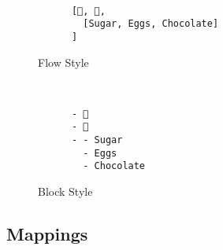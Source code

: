 \documentclass[a4paper, svgnames, 12pt]{article}
\begin{document}
\begin{figure}[H]
  \begin{minipage}[t]{0.48\textwidth}
    \vspace{0pt}
    \begin{bchart}[max=9, width=0.85\textwidth]
    \end{bchart}
  \end{minipage}
  \begin{minipage}[t]{0pt}~\end{minipage}
  \begin{minipage}[t]{0.48\textwidth}
    \vspace{0pt}
    \begin{verbatim}
      [🍎, 🍊,
        [Sugar, Eggs, Chocolate]
      ]
    \end{verbatim}
  \end{minipage}
  \caption{Flow Style}
\end{figure}

\begin{figure}[H]
  \begin{minipage}[t]{0.48\textwidth}
    \vspace{0pt}
    \begin{bchart}[max=9, width=0.85\textwidth]
    \end{bchart}
  \end{minipage}
  \begin{minipage}[t]{0pt}~\end{minipage}
  \begin{minipage}[t]{0.48\textwidth}
    \vspace{0pt}
    \begin{verbatim}
      - 🍎
      - 🍊
      - - Sugar
        - Eggs
        - Chocolate
    \end{verbatim}
  \end{minipage}
  \caption{Block Style}
\end{figure}

\subsection{Mappings}
\end{document}
